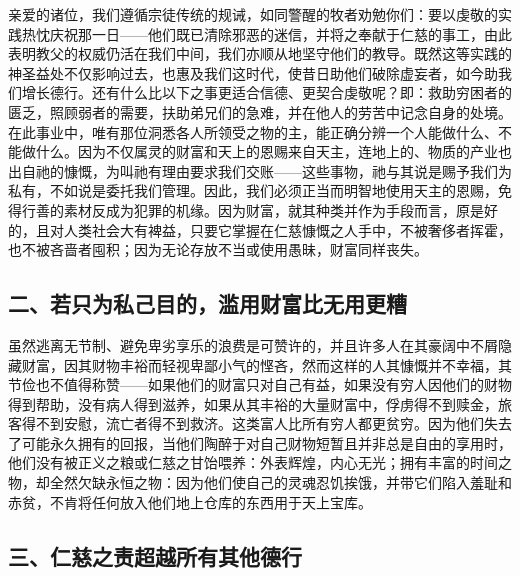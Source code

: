 亲爱的诸位，我们遵循宗徒传统的规诫，如同警醒的牧者劝勉你们：要以虔敬的实践热忱庆祝那一日——他们既已清除邪恶的迷信，并将之奉献于仁慈的事工，由此表明教父的权威仍活在我们中间，我们亦顺从地坚守他们的教导。既然这等实践的神圣益处不仅影响过去，也惠及我们这时代，使昔日助他们破除虚妄者，如今助我们增长德行。还有什么比以下之事更适合信德、更契合虔敬呢？即：救助穷困者的匮乏，照顾弱者的需要，扶助弟兄们的急难，并在他人的劳苦中记念自身的处境。在此事业中，唯有那位洞悉各人所领受之物的主，能正确分辨一个人能做什么、不能做什么。因为不仅属灵的财富和天上的恩赐来自天主，连地上的、物质的产业也出自祂的慷慨，为叫祂有理由要求我们交账——这些事物，祂与其说是赐予我们为私有，不如说是委托我们管理。因此，我们必须正当而明智地使用天主的恩赐，免得行善的素材反成为犯罪的机缘。因为财富，就其种类并作为手段而言，原是好的，且对人类社会大有裨益，只要它掌握在仁慈慷慨之人手中，不被奢侈者挥霍，也不被吝啬者囤积；因为无论存放不当或使用愚昧，财富同样丧失。\par


\subsection{二、若只为私己目的，滥用财富比无用更糟}

虽然逃离无节制、避免卑劣享乐的浪费是可赞许的，并且许多人在其豪阔中不屑隐藏财富，因其财物丰裕而轻视卑鄙小气的悭吝，然而这样的人其慷慨并不幸福，其节俭也不值得称赞——如果他们的财富只对自己有益，如果没有穷人因他们的财物得到帮助，没有病人得到滋养，如果从其丰裕的大量财富中，俘虏得不到赎金，旅客得不到安慰，流亡者得不到救济。这类富人比所有穷人都更贫穷。因为他们失去了可能永久拥有的回报，当他们陶醉于对自己财物短暂且并非总是自由的享用时，他们没有被正义之粮或仁慈之甘饴喂养：外表辉煌，内心无光；拥有丰富的时间之物，却全然欠缺永恒之物：因为他们使自己的灵魂忍饥挨饿，并带它们陷入羞耻和赤贫，不肯将任何放入他们地上仓库的东西用于天上宝库。\par


\subsection{三、仁慈之责超越所有其他德行}

